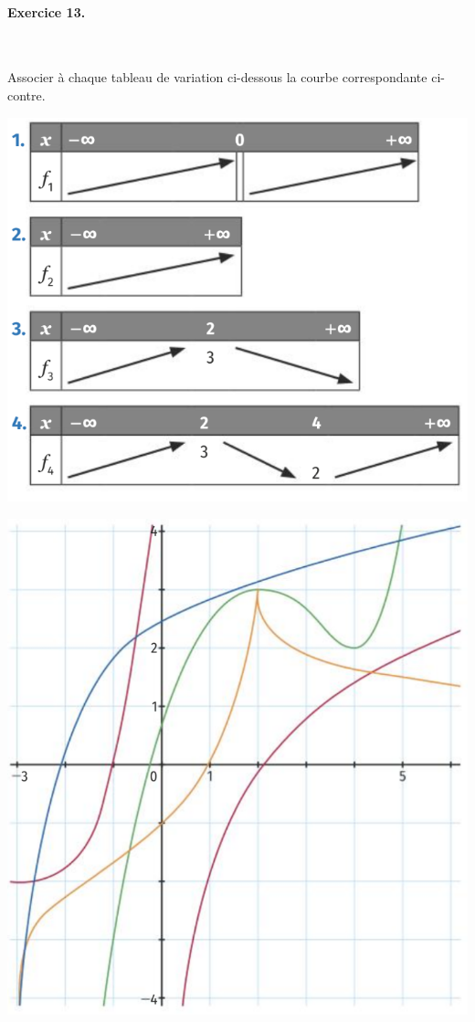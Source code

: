\documentclass[11pt]{article}
\begin{document}
\paragraph{Exercice 13.}~\\[0mm]
\begin{minipage}{.5\textwidth}
  Associer à chaque tableau de variation ci-dessous la courbe correspondante
  ci-contre.
  \begin{center}
    \includegraphics[scale=.3]{tableau.png}
  \end{center}
\end{minipage}
\begin{minipage}{.5\textwidth}
  \begin{center}
    \includegraphics[scale=.26]{4courbes1.png}
  \end{center}
\end{minipage}
\end{document}
